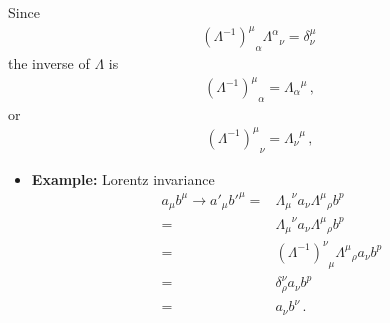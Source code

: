 Since
\begin{align}
  {\left(\Lambda^{-1}\right)^\mu}_\alpha{\Lambda^\alpha}_{\nu}=\delta^\mu_\nu\,
\end{align}
the inverse of $\Lambda$ is
\begin{align}
  {\left(\Lambda^{-1}\right)^\mu}_\alpha={\Lambda_\alpha}^\mu\,,
\end{align}
or
\begin{align}
\label{eq:lambdainv}
  {\left(\Lambda^{-1}\right)^\mu}_\nu={\Lambda_\nu}^\mu\,,
\end{align}
\begin{itemize}
\item \textbf{Example:} Lorentz invariance
  \begin{align}
    a_\mu b^\mu\to a'_\mu{b'}^\mu=&{\Lambda_\mu}^\nu a_\nu{\Lambda^\mu}_\rho b^p \nonumber\\
    =&{\Lambda_\mu}^\nu a_\nu{\Lambda^\mu}_\rho b^p \nonumber\\
    =&{\left(\Lambda^{-1}\right)^\nu}_\mu{\Lambda^\mu}_\rho a_\nu b^p \nonumber\\
    =&\delta^\nu_\rho a_\nu b^p \nonumber\\
    =&a_\nu b^\nu \nonumber\,.
  \end{align}

\end{itemize}

